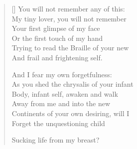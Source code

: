 \settowidth{\versewidth}{As you shed the chrysalis of your infant}
\begin{verse}[\versewidth]
You will not remember any of this:\\
My tiny lover, you will not remember\\
Your first glimpse of my face\\
Or the first touch of my hand\\
Trying to read the Braille of your new\\
And frail and frightening self.

And I fear my own forgetfulness:\\
As you shed the chrysalis of your infant\\
Body, infant self, awaken and walk\\
Away from me and into the new\\
Continents of your own desiring, will I\\
Forget the unquestioning child

Sucking life from my breast?
\end{verse}
